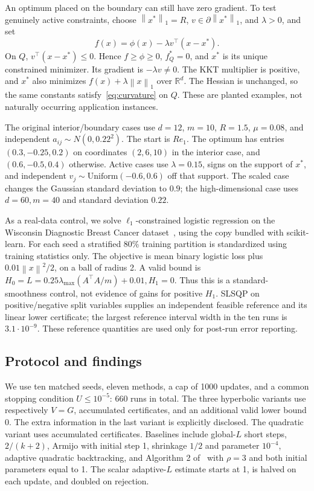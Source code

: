 \documentclass[11pt]{article}
\newcommand{\norm}[1]{\left\|#1\right\|}
\newcommand{\R}{\mathbb R}
\begin{document}
An optimum placed on the boundary can still have zero gradient.
To test genuinely active constraints, choose $\norm{x^*}_1=R$,
$v\in\partial\norm{x^*}_1$, and $\lambda>0$, and set
\begin{equation}\label{eq:active}
 f(x)=\phi(x)-\lambda v^\top(x-x^*).
\end{equation}
On $Q$, $v^\top(x-x^*)\le0$. Hence $f\ge\phi\ge0$, $f_Q^*=0$,
and $x^*$ is its unique constrained minimizer. Its gradient is
$-\lambda v\ne0$. The KKT multiplier is positive, and $x^*$ also
minimizes $f(x)+\lambda\norm x_1$ over $\R^d$. The Hessian is unchanged,
so the same constants satisfy~\eqref{eq:curvature} on $Q$.
These are planted examples, not naturally occurring application instances.

The original interior/boundary cases use $d=12$, $m=10$, $R=1.5$,
$\mu=0.08$, and independent $a_{ij}\sim N(0,0.22^2)$.
The start is $Re_1$. The optimum has entries $(0.3,-0.25,0.2)$ on
coordinates $(2,6,10)$ in the interior case, and $(0.6,-0.5,0.4)$ otherwise.
Active cases use $\lambda=0.15$, signs on the support of $x^*$, and
independent $v_j\sim\mathrm{Uniform}(-0.6,0.6)$ off that support.
The scaled case changes the Gaussian standard deviation to $0.9$;
the high-dimensional case uses $d=60,m=40$ and standard deviation $0.22$.

As a real-data control, we solve $\ell_1$-constrained logistic regression
on the Wisconsin Diagnostic Breast Cancer dataset~\cite{wdbc}, using the
copy bundled with scikit-learn. For each seed a stratified 80\% training
partition is standardized using training statistics only. The objective is
mean binary logistic loss plus $0.01\norm x^2/2$, on a ball of radius 2.
A valid bound is $H_0=L=0.25\lambda_{\max}(A^\top A/m)+0.01,H_1=0$.
Thus this is a standard-smoothness control, not evidence of gains for
positive $H_1$. SLSQP on positive/negative split variables supplies an
independent feasible reference and its linear lower certificate; the
largest reference interval width in the ten runs is $3.1\cdot10^{-9}$.
These reference quantities are used only for post-run error reporting.

\subsection{Protocol and findings}
We use ten matched seeds, eleven methods, a cap of 1000 updates, and a
common stopping condition $U\le10^{-5}$: 660 runs in total. The three
hyperbolic variants use respectively $V=G$, accumulated certificates, and
an additional valid lower bound 0. The extra information in the last
variant is explicitly disclosed. The quadratic variant uses accumulated
certificates. Baselines include global-$L$ short steps, $2/(k+2)$, Armijo
with initial step 1, shrinkage $1/2$ and parameter $10^{-4}$, adaptive
quadratic backtracking, and Algorithm 2 of~\cite{vyguzov} with $\rho=3$
and both initial parameters equal to 1. The scalar adaptive-$L$ estimate
starts at 1, is halved on each update, and doubled on rejection.
\end{document}
